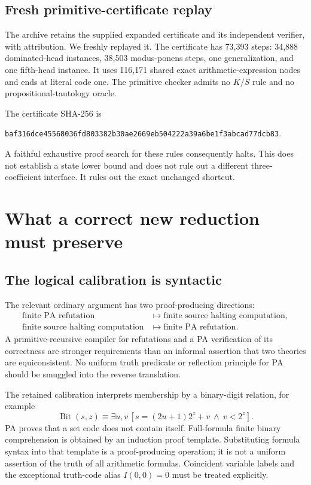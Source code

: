 \documentclass[11pt]{article}
\begin{document}
\subsection{Fresh primitive-certificate replay}
The archive retains the supplied expanded certificate and its independent verifier, with attribution. We freshly replayed it. The certificate has 73,393 steps: 34,888 dominated-head instances, 38,503 modus-ponens steps, one generalization, and one fifth-head instance. It uses 116,171 shared exact arithmetic-expression nodes and ends at literal code one. The primitive checker admits no $K/S$ rule and no propositional-tautology oracle.

The certificate SHA-256 is
\begin{center}\scriptsize
\nolinkurl{baf316dce45568036fd803382b30ae2669eb504222a39a6be1f3abcad77dcb83}.
\end{center}
A faithful exhaustive proof search for these rules consequently halts. This does not establish a state lower bound and does not rule out a different three-coefficient interface. It rules out the exact unchanged shortcut.

\section{What a correct new reduction must preserve}
\subsection{The logical calibration is syntactic}
The relevant ordinary argument has two proof-producing directions:
\begin{align*}
 \text{finite PA refutation}&\longmapsto\text{finite source halting computation},\\
 \text{finite source halting computation}&\longmapsto\text{finite PA refutation}.
\end{align*}
A primitive-recursive compiler for refutations and a PA verification of its correctness are stronger requirements than an informal assertion that two theories are equiconsistent. No uniform truth predicate or reflection principle for PA should be smuggled into the reverse translation.

The retained calibration interprets membership by a binary-digit relation, for example
\[
 \operatorname{Bit}(s,z)\equiv\exists u,v\,
 [s=(2u+1)2^z+v\ \wedge\ v<2^z].
\]
PA proves that a set code does not contain itself. Full-formula finite binary comprehension is obtained by an induction proof template. Substituting formula syntax into that template is a proof-producing operation; it is not a uniform assertion of the truth of all arithmetic formulas. Coincident variable labels and the exceptional truth-code alias $I(0,0)=0$ must be treated explicitly.\cite{pa195,nq}
\end{document}
